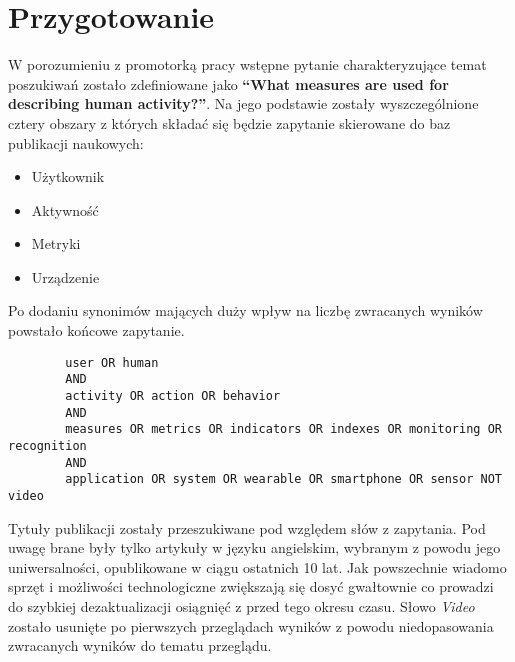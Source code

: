 \section{Przygotowanie}
W porozumieniu z promotorką pracy wstępne pytanie charakteryzujące temat poszukiwań zostało zdefiniowane jako \textbf{``What measures are used for describing human activity?''}. Na jego podstawie zostały wyszczególnione cztery obszary z których składać się będzie zapytanie skierowane do baz publikacji naukowych:
\begin{itemize}
    \item Użytkownik
    \item Aktywność
    \item Metryki
    \item Urządzenie
\end{itemize}

Po dodaniu synonimów mających duży wpływ na liczbę zwracanych wyników powstało końcowe zapytanie. 
\begin{center}
	\begin{minipage}{0.9\linewidth}
		\begin{verbatim}
		user OR human
		AND
		activity OR action OR behavior
		AND
		measures OR metrics OR indicators OR indexes OR monitoring OR recognition
		AND
		application OR system OR wearable OR smartphone OR sensor NOT video
		\end{verbatim}
	\end{minipage}
\end{center}

Tytuły publikacji zostały przeszukiwane pod względem słów z zapytania. Pod uwagę brane były tylko artykuły w języku angielskim, wybranym z powodu jego uniwersalności, opublikowane w ciągu ostatnich 10 lat. Jak powszechnie wiadomo sprzęt i możliwości technologiczne zwiększają się dosyć gwałtownie co prowadzi do szybkiej dezaktualizacji osiągnięć z przed tego okresu czasu. Słowo \textit{Video} zostało usunięte po pierwszych przeglądach wyników z powodu niedopasowania zwracanych wyników do tematu przeglądu.
